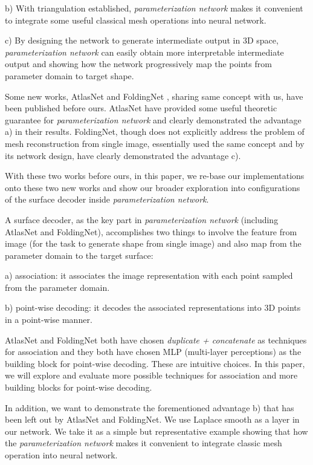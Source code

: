 {b) With triangulation established, \emph{parameterization network} makes it convenient to integrate some useful classical mesh operations into neural network.

c) By designing the network to generate intermediate output in 3D space, \emph{parameterization network} can easily obtain more interpretable intermediate output and showing how the network progressively map the points from parameter domain to target shape.   

Some new works, AtlasNet\cite{atlasnet} and FoldingNet\cite{foldingnet} , sharing same concept with us, have been published before ours. AtlasNet\cite{atlasnet} have provided some useful theoretic guarantee for \emph{parameterization network} and clearly demonstrated the advantage a) in their results. FoldingNet\cite{foldingnet}, though does not explicitly address the problem of mesh reconstruction from single image, essentially used the same concept and by its network design, have clearly demonstrated the advantage c). 

With these two works before ours, in this paper, we re-base our implementations onto these two new works and show our broader exploration into configurations of the surface decoder inside \emph{parameterization network}.

A surface decoder, as the key part in \emph{parameterization network} (including AtlasNet\cite{atlasnet} and FoldingNet\cite{foldingnet}), accomplishes two things to involve the feature from image (for the task to generate shape from single image) and also map from the parameter domain to the target surface:
 
a) association: it associates the image representation with each point sampled from the parameter domain. 
 
b) point-wise decoding: it decodes the associated representations into 3D points in a point-wise manner.
 
 AtlasNet\cite{atlasnet} and FoldingNet\cite{foldingnet} both have chosen \emph{duplicate + concatenate} as techniques for association and they both have chosen MLP (multi-layer perceptions) as the building block for point-wise decoding.
These are intuitive choices. In this paper, we will explore and evaluate more possible techniques for association and more building blocks for point-wise decoding.

In addition, we want to demonstrate the forementioned advantage b) that has been left out by AtlasNet\cite{atlasnet} and FoldingNet\cite{foldingnet}. We use Laplace smooth as a layer in our network. We take it as a simple but representative example showing that how the \emph{parameterization network} makes it convenient to integrate classic mesh operation into neural network. 
}


 